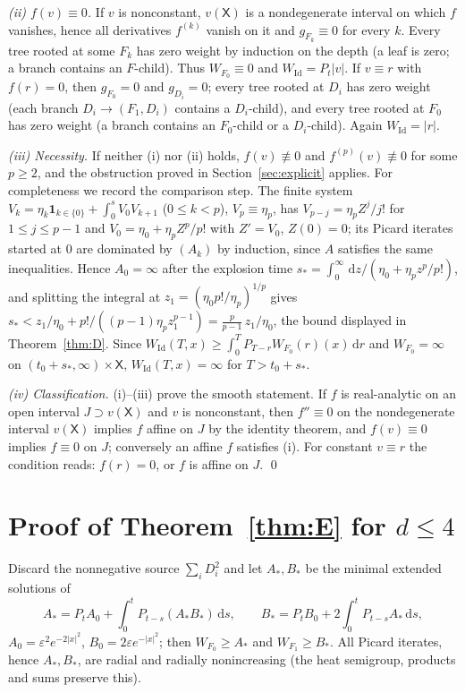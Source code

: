 \documentclass[11pt]{article}
\theoremstyle{definition}
\theoremstyle{remark}
\newcommand{\X}{\mathsf{X}}
\newcommand{\Id}{\mathrm{Id}}
\newcommand{\dd}{\,\mathrm{d}}
\begin{document}
\emph{(ii) $f(v)\equiv0$.} If $v$ is nonconstant, $v(\X)$ is a
nondegenerate interval on which $f$ vanishes, hence all derivatives
$f^{(k)}$ vanish on it and $g_{F_k}\equiv0$ for every $k$. Every tree rooted
at some $F_k$ has zero weight by induction on the depth (a leaf is zero; a
branch contains an $F$-child). Thus $W_{F_0}\equiv0$ and $W_\Id=P_t|v|$. If
$v\equiv r$ with $f(r)=0$, then $g_{F_0}=0$ and $g_{D_i}=0$; every tree
rooted at $D_i$ has zero weight (each branch $D_i\to(F_1,D_i)$ contains a
$D_i$-child), and every tree rooted at $F_0$ has zero weight (a branch
contains an $F_0$-child or a $D_i$-child). Again $W_\Id=|r|$.

\emph{(iii) Necessity.} If neither (i) nor (ii) holds, $f(v)\not\equiv0$
and $f^{(p)}(v)\not\equiv0$ for some $p\ge2$, and the obstruction proved
in Section~\ref{sec:explicit} applies. For completeness we record the
comparison step. The finite system $V_k=\eta_k\mathbf 1_{k\in\{0\}}+
\int_0^sV_0V_{k+1}$ ($0\le k<p$), $V_p\equiv\eta_p$, has
$V_{p-j}=\eta_pZ^j/j!$ for $1\le j\le p-1$ and
$V_0=\eta_0+\eta_pZ^p/p!$ with $Z'=V_0$, $Z(0)=0$; its Picard iterates
started at $0$ are dominated by $(A_k)$ by induction, since $A$
satisfies the same inequalities. Hence $A_0=\infty$ after the explosion
time $s_*=\int_0^\infty\dd z/(\eta_0+\eta_pz^p/p!)$, and splitting the
integral at $z_1=(\eta_0p!/\eta_p)^{1/p}$ gives
$s_*<z_1/\eta_0+p!/((p-1)\eta_pz_1^{p-1})=\frac p{p-1}\,z_1/\eta_0$, the
bound displayed in Theorem~\ref{thm:D}. Since
$W_\Id(T,x)\ge\int_0^TP_{T-r}W_{F_0}(r)(x)\dd r$ and $W_{F_0}=\infty$ on
$(t_0+s_*,\infty)\times\X$, $W_\Id(T,x)=\infty$ for $T>t_0+s_*$.

\emph{(iv) Classification.} (i)--(iii) prove the smooth statement. If
$f$ is real-analytic on an open interval $J\supset v(\X)$ and $v$ is
nonconstant, then $f''\equiv0$ on the nondegenerate interval $v(\X)$
implies $f$ affine on $J$ by the identity theorem, and $f(v)\equiv0$
implies $f\equiv0$ on $J$; conversely an affine $f$ satisfies (i). For
constant $v\equiv r$ the condition reads: $f(r)=0$, or $f$ is affine on
$J$. \qed

\section{Proof of Theorem~\ref{thm:E} for $d\le4$}\label{app:E}

Discard the nonnegative source $\sum_iD_i^2$ and let $A_*,B_*$ be the
minimal extended solutions of
\[
A_*=P_tA_0+\int_0^tP_{t-s}(A_*B_*)\dd s,\qquad
B_*=P_tB_0+2\int_0^tP_{t-s}A_*\dd s,
\]
$A_0=\varepsilon^2e^{-2|x|^2}$, $B_0=2\varepsilon e^{-|x|^2}$; then
$W_{F_0}\ge A_*$ and $W_{F_1}\ge B_*$. All Picard iterates, hence $A_*,B_*$,
are radial and radially nonincreasing (the heat semigroup, products and
sums preserve this).
\end{document}
